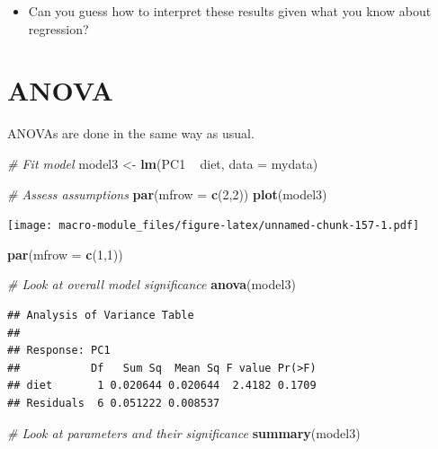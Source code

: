 \documentclass[]{book}
\newenvironment{Shaded}{\begin{snugshade}}{\end{snugshade}}
\newcommand{\KeywordTok}[1]{\textcolor[rgb]{0.13,0.29,0.53}{\textbf{{#1}}}}
\newcommand{\DataTypeTok}[1]{\textcolor[rgb]{0.13,0.29,0.53}{{#1}}}
\newcommand{\DecValTok}[1]{\textcolor[rgb]{0.00,0.00,0.81}{{#1}}}
\newcommand{\StringTok}[1]{\textcolor[rgb]{0.31,0.60,0.02}{{#1}}}
\newcommand{\CommentTok}[1]{\textcolor[rgb]{0.56,0.35,0.01}{\textit{{#1}}}}
\newcommand{\NormalTok}[1]{{#1}}
\providecommand{\tightlist}{%
  \setlength{\itemsep}{0pt}\setlength{\parskip}{0pt}}
\begin{document}
\begin{itemize}
\tightlist
\item
  Can you guess how to interpret these results given what you know about
  regression?
\end{itemize}

\section{ANOVA}\label{anova}

ANOVAs are done in the same way as usual.

\begin{Shaded}
\begin{Highlighting}[]
\CommentTok{# Fit model}
\NormalTok{model3 <-}\StringTok{ }\KeywordTok{lm}\NormalTok{(PC1 ~}\StringTok{ }\NormalTok{diet, }\DataTypeTok{data =} \NormalTok{mydata)}

\CommentTok{# Assess assumptions}
\KeywordTok{par}\NormalTok{(}\DataTypeTok{mfrow =} \KeywordTok{c}\NormalTok{(}\DecValTok{2}\NormalTok{,}\DecValTok{2}\NormalTok{))}
\KeywordTok{plot}\NormalTok{(model3)}
\end{Highlighting}
\end{Shaded}

\texttt{[image: macro-module\_files/figure-latex/unnamed-chunk-157-1.pdf]}

\begin{Shaded}
\begin{Highlighting}[]
\KeywordTok{par}\NormalTok{(}\DataTypeTok{mfrow =} \KeywordTok{c}\NormalTok{(}\DecValTok{1}\NormalTok{,}\DecValTok{1}\NormalTok{))}

\CommentTok{# Look at overall model significance}
\KeywordTok{anova}\NormalTok{(model3)}
\end{Highlighting}
\end{Shaded}

\begin{verbatim}
## Analysis of Variance Table
## 
## Response: PC1
##           Df   Sum Sq  Mean Sq F value Pr(>F)
## diet       1 0.020644 0.020644  2.4182 0.1709
## Residuals  6 0.051222 0.008537
\end{verbatim}

\begin{Shaded}
\begin{Highlighting}[]
\CommentTok{# Look at parameters and their significance}
\KeywordTok{summary}\NormalTok{(model3)}
\end{Highlighting}
\end{Shaded}
\end{document}
